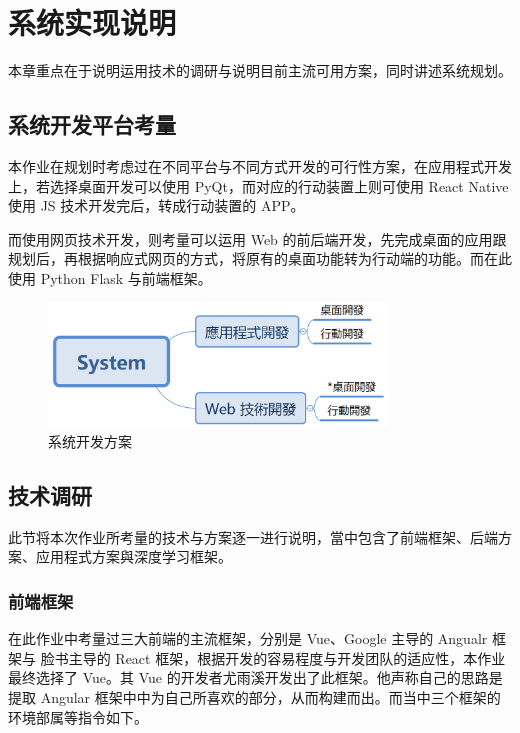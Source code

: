 \chapter{系统实现说明}
\label{chap:2}

本章重点在于说明运用技术的调研与说明目前主流可用方案，同时讲述系统规划。

\section{系统开发平台考量}

本作业在规划时考虑过在不同平台与不同方式开发的可行性方案，在应用程式开发上，若选择桌面开发可以使用 PyQt，而对应的行动装置上则可使用 React Native 使用 JS 技术开发完后，转成行动装置的 APP。

而使用网页技术开发，则考量可以运用 Web 的前后端开发，先完成桌面的应用跟规划后，再根据响应式网页的方式，将原有的桌面功能转为行动端的功能。而在此使用 Python Flask 与前端框架。

\begin{figure}[htb]
\centering 
\includegraphics[width=0.80\textwidth]{img/ch2m0.png} 
\caption{系统开发方案}
\label{Test}
\end{figure}



\section{技术调研}

此节将本次作业所考量的技术与方案逐一进行说明，當中包含了前端框架、后端方案、应用程式方案與深度学习框架。

\subsection{前端框架}

在此作业中考量过三大前端的主流框架，分别是 Vue、Google 主导的 Angualr 框架与 脸书主导的 React 框架，根据开发的容易程度与开发团队的适应性，本作业最终选择了 Vue。其 Vue 的开发者尤雨溪开发出了此框架。他声称自己的思路是提取 Angular 框架中中为自己所喜欢的部分，从而构建而出。而当中三个框架的环境部属等指令如下。

